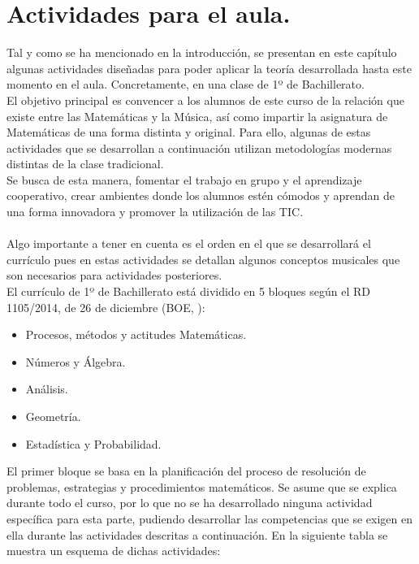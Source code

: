 \documentclass[a4paper, openright, 11pt, titlepage]{report}
\theoremstyle{definition}\newtheorem{defin}[propo]{Definition}
\theoremstyle{definition}\newtheorem{obser}[propo]{Remark}
\theoremstyle{definition}\newtheorem{ejem}[propo]{Ejemplo}
\theoremstyle{definition}\newtheorem{algoritmo}[propo]{Algoritmo}
\begin{document}
\chapter{Actividades para el aula.}
Tal y como se ha mencionado en la introducción, se presentan en este capítulo algunas actividades diseñadas para poder aplicar la teoría desarrollada hasta este momento en el aula. Concretamente, en una clase de 1º de Bachillerato.\\
El objetivo principal es convencer a los alumnos de este curso de la relación que existe entre las Matemáticas y la Música, así como impartir la asignatura de Matemáticas de una forma distinta y original. Para ello, algunas de estas actividades que se desarrollan a continuación utilizan metodologías modernas distintas de la clase tradicional. \\
Se busca de esta manera, fomentar el trabajo en grupo y el aprendizaje cooperativo, crear ambientes donde los alumnos estén cómodos y aprendan de una forma innovadora y promover la utilización de las TIC.\\\\
Algo importante a tener en cuenta es el orden en el que se desarrollará el currículo pues en estas actividades se detallan algunos conceptos musicales que son necesarios para actividades posteriores.\\
El currículo de 1º de Bachillerato está dividido en 5 bloques según el RD 1105/2014, de 26 de diciembre (BOE, \cite{boe}):
\begin{itemize}
    \item Procesos, métodos y actitudes Matemáticas.
    \item Números y Álgebra.
    \item Análisis.
    \item Geometría.
    \item Estadística y Probabilidad.
\end{itemize}
El primer bloque se basa en la planificación del proceso de resolución de problemas, estrategias y procedimientos matemáticos. Se asume que se explica durante todo el curso, por lo que no se ha desarrollado ninguna actividad específica para esta parte, pudiendo desarrollar las competencias que se exigen en ella durante las actividades descritas a continuación. En la siguiente tabla se muestra un esquema de dichas actividades:
\end{document}

